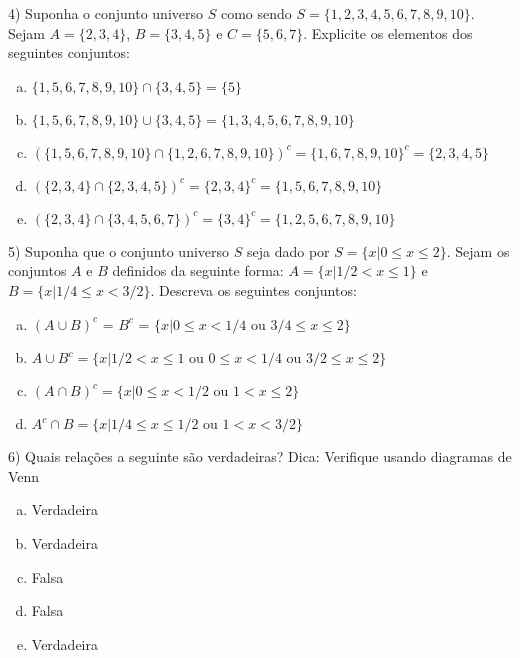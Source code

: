 \documentclass{article}
\begin{document}
4) Suponha o conjunto universo $S$ como sendo $S= \{1,2,3,4,5,6,7,8,9,10\}$. Sejam $A=\{2,3,4\}$, $B=\{3,4,5\}$ e $C=\{5,6,7\}$. Explicite os elementos dos seguintes conjuntos:

\begin{enumerate}[a)] %
    \item $\{1,5,6,7,8,9,10\} \cap \{3,4,5\} = \{5\}$
    \item$\{1,5,6,7,8,9,10\} \cup \{3,4,5\} = \{1,3,4,5,6,7,8,9,10\}$
    \item $(\{1,5,6,7,8,9,10\} \cap \{1,2,6,7,8,9,10\})^c = \{1,6,7,8,9, 10\}^c = \{2,3,4,5\}$
    \item $(\{2,3,4\} \cap \{2,3,4,5\})^c = \{2,3,4\}^c = \{1,5,6,7,8,9,10\}$
    \item $(\{2,3,4\} \cap \{3,4,5,6,7\})^c = \{3,4\}^c = \{1,2,5,6,7,8,9,10\} $
\end{enumerate}
\vspace{10px}

5) Suponha que o conjunto universo $S$ seja dado por $S=\{x | 0 \leq x \leq 2\}$. Sejam os conjuntos $A$ e $B$ definidos da seguinte forma: $A = \{x| 1/2 < x \leq 1\}$ e $B=\{x|1/4 \leq x < 3/2\}$. Descreva os seguintes conjuntos:

\begin{enumerate}[a)] %
    \item $(A \cup B)^c$ = $B^c$ = $\{x | 0 \leq x < 1/4 \text{ ou } 3/4 \leq x \leq 2\}$ 
    \item $A \cup B^c = \{x | 1/2 < x \leq  1 \text{ ou } 0 \leq x < 1/4 \text{ ou } 3/2 \leq x \leq 2\}$
    \item $(A \cap B)^c = \{x| 0 \leq x < 1/2 \text{ ou } 1 < x \leq 2\}$
    \item $A^c \cap B = \{x| 1/4 \leq x \leq 1/2 \text{ ou } 1 < x <3/2\}$
\end{enumerate}

\vspace{10px}


6) Quais relações a seguinte são verdadeiras? Dica: Verifique usando diagramas de Venn

\begin{enumerate}[a)] %
    \item Verdadeira
    \item Verdadeira
    \item Falsa
    \item Falsa
    \item Verdadeira
\end{enumerate}
\vspace{10px}
\end{document}
